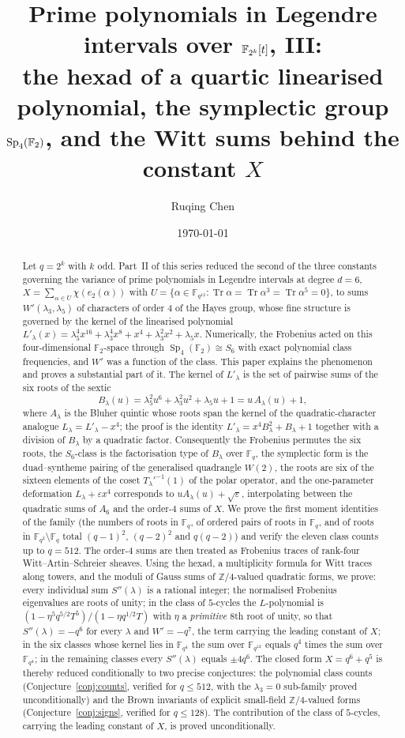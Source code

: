 ﻿\documentclass[12pt,a4paper]{amsart}
\title[Legendre intervals in even characteristic, III]{Prime polynomials in Legendre intervals over \texorpdfstring{$\F_{2^k}[t]$}{F(2k)[t]}, III:\texorpdfstring{\\}{ }the hexad of a quartic linearised polynomial, the symplectic group \texorpdfstring{$\Sp_4(\F_2)$}{Sp4(F2)}, and the Witt sums behind the constant \texorpdfstring{$X$}{X}}
\author{Ruqing Chen}
\date{\today}
\theoremstyle{definition}
\newcommand{\F}{\mathbb{F}}
\newcommand{\Z}{\mathbb{Z}}
\newcommand{\Tr}{\operatorname{Tr}}
\newcommand{\Sp}{\operatorname{Sp}}
\newcommand{\eps}{\varepsilon}
\newcommand{\Spp}{S''}
\begin{document}
\begin{abstract}
Let $q=2^k$ with $k$ odd. Part~II of this series reduced the second of the three constants governing the variance of prime polynomials in Legendre intervals at degree $d=6$, $X=\sum_{\alpha\in U}\chi(e_2(\alpha))$ with $U=\{\alpha\in\F_{q^{12}}:\Tr\alpha=\Tr\alpha^3=\Tr\alpha^5=0\}$, to sums $W'(\lambda_3,\lambda_5)$ of characters of order $4$ of the Hayes group, whose fine structure is governed by the kernel of the linearised polynomial $L'_\lambda(x)=\lambda_5^4x^{16}+\lambda_3^4x^8+x^4+\lambda_3^2x^2+\lambda_5x$. Numerically, the Frobenius acted on this four-dimensional $\F_2$-space through $\Sp_4(\F_2)\cong S_6$ with exact polynomial class frequencies, and $W'$ was a function of the class. This paper explains the phenomenon and proves a substantial part of it. The kernel of $L'_\lambda$ is the set of pairwise sums of the six roots of the sextic
\[
B_\lambda(u)=\lambda_5^2u^6+\lambda_3^2u^2+\lambda_5u+1=u\,A_\lambda(u)+1,
\]
where $A_\lambda$ is the Bluher quintic whose roots span the kernel of the quadratic-character analogue $L_\lambda=L'_\lambda-x^4$; the proof is the identity $L'_\lambda=x^4B_\lambda^2+B_\lambda+1$ together with a division of $B_\lambda$ by a quadratic factor. Consequently the Frobenius permutes the six roots, the $S_6$-class is the factorisation type of $B_\lambda$ over $\F_q$, the symplectic form is the duad--syntheme pairing of the generalised quadrangle $W(2)$, the roots are six of the sixteen elements of the coset $T_\lambda'^{-1}(1)$ of the polar operator, and the one-parameter deformation $L_\lambda+\eps x^4$ corresponds to $uA_\lambda(u)+\sqrt\eps$, interpolating between the quadratic sums of $A_6$ and the order-$4$ sums of $X$. We prove the first moment identities of the family (the numbers of roots in $\F_q$, of ordered pairs of roots in $\F_q$, and of roots in $\F_{q^2}\setminus\F_q$ total $(q-1)^2$, $(q-2)^2$ and $q(q-2)$) and verify the eleven class counts up to $q=512$. The order-$4$ sums are then treated as Frobenius traces of rank-four Witt--Artin--Schreier sheaves. Using the hexad, a multiplicity formula for Witt traces along towers, and the moduli of Gauss sums of $\Z/4$-valued quadratic forms, we prove: every individual sum $\Spp(\lambda)$ is a rational integer; the normalised Frobenius eigenvalues are roots of unity; in the class of $5$-cycles the $L$-polynomial is $(1-\eta^5q^{5/2}T^5)/(1-\eta q^{1/2}T)$ with $\eta$ a \emph{primitive} $8$th root of unity, so that $\Spp(\lambda)=-q^6$ for every $\lambda$ and $W'=-q^7$, the term carrying the leading constant of $X$; in the six classes whose kernel lies in $\F_{q^4}$ the sum over $\F_{q^{12}}$ equals $q^4$ times the sum over $\F_{q^4}$; in the remaining classes every $\Spp(\lambda)$ equals $\pm4q^6$. The closed form $X=q^6+q^5$ is thereby reduced conditionally to two precise conjectures: the polynomial class counts (Conjecture~\ref{conj:counts}, verified for $q\le512$, with the $\lambda_3=0$ sub-family proved unconditionally) and the Brown invariants of explicit small-field $\Z/4$-valued forms (Conjecture~\ref{conj:signs}, verified for $q\le128$). The contribution of the class of $5$-cycles, carrying the leading constant of $X$, is proved unconditionally.
\end{abstract}
\end{document}
